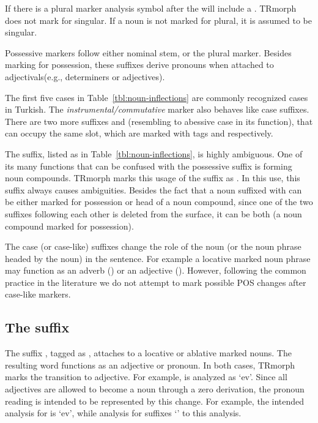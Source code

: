 \documentclass[twocolumn]{article}
\begin{document}
If there is a plural marker analysis symbol after the  will
include a . TRmorph does not mark for singular. If a noun is
not marked for plural, it is assumed to be singular. 


Possessive markers follow either nominal stem, or the plural marker.
Besides marking for possession, these suffixes derive pronouns when
attached to adjectivals(e.g., determiners or adjectives).

The first five cases in Table~\ref{tbl:noun-inflections} are commonly
recognized cases in Turkish. The \emph{instrumental/commutative}
marker also behaves like case suffixes. There are two more suffixes
 and  (resembling to abessive case in its
function), that can occupy the same slot, which are marked with tags
 and  respectively.

The  suffix, listed as  in
Table~\ref{tbl:noun-inflections}, is highly ambiguous. One of its many
functions that can be confused with the possessive suffix is forming
noun compounds. TRmorph marks this usage of the suffix  as
. In this use, this suffix always causes ambiguities.
Besides the fact that a noun suffixed with  can be 
either marked for possession or head of a noun compound, since
one of the two  suffixes following each other is deleted
from the surface, it can be both (a noun compound marked for
possession).

The case (or case-like) suffixes change the role of the noun (or the
noun phrase headed by the noun) in the sentence. For example a
locative marked noun phrase may function as an adverb () or an adjective (). However, following the common practice in the literature we
do not attempt to mark possible POS changes after case-like markers.

\subsection{The suffix }

The suffix , tagged as , attaches to a locative
or ablative marked nouns.  The resulting word functions as an
adjective or pronoun. In both cases, TRmorph marks the transition to
adjective. For example,  is analyzed as
`ev'. Since all adjectives are
allowed to become a noun through a zero derivation, the pronoun
reading is intended to be represented by this change. For example, the
intended analysis for  is
`ev',
while analysis for  suffixes `' to this analysis.
\end{document}
